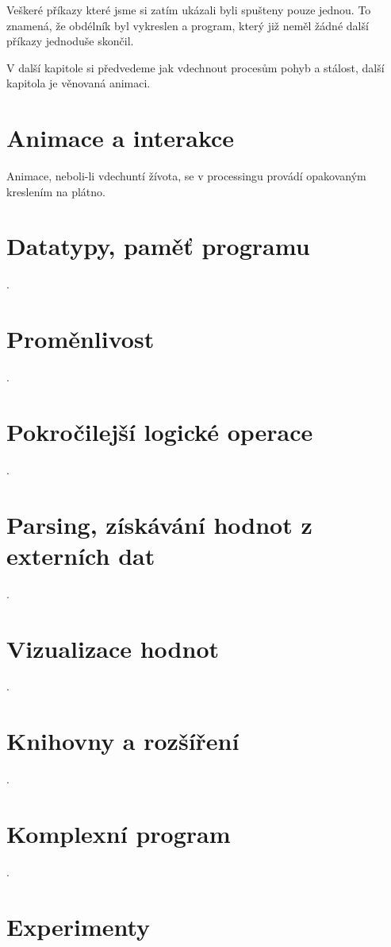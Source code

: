 \documentclass[11pt]{article}
\begin{document}
Veškeré příkazy které jsme si zatím ukázali byli spušteny pouze jednou. To znamená, že obdélník byl vykreslen a program, který již neměl žádné další příkazy jednoduše skončil.

V další kapitole si předvedeme jak vdechnout procesům pohyb a stálost, další kapitola je věnovaná animaci.

\section{Animace a interakce}

Animace, neboli-li vdechuntí žívota, se v processingu provádí opakovaným kreslením na plátno.

\newpage
\section{Datatypy, paměť programu}
.
\newpage
\section{Proměnlivost}
.
\newpage
\section{Pokročilejší logické operace}
.
\newpage
\section{Parsing, získávání hodnot z externích dat}
.
\newpage
\section{Vizualizace hodnot}
.
\newpage
\section{Knihovny a rozšíření}
.
\newpage
\section{Komplexní program}
.
\newpage
\section{Experimenty}
\end{document}
